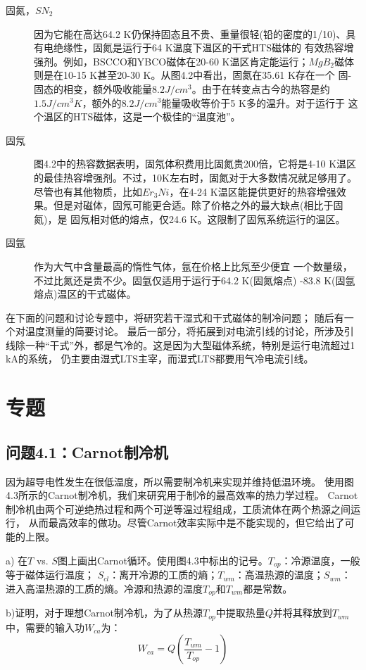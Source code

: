 \begin{description}
  \item[固氮，$SN_2$] 因为它能在高达64.2 K仍保持固态且不贵、重量很轻(铅的密度的1/10)、具有电绝缘性，固氮是运行于64 K温度下温区的干式HTS磁体的
  有效热容增强剂。例如，BSCCO和YBCO磁体在20-60 K温区肯定能运行；$MgB_2$磁体则是在10-15 K甚至20-30 K。从图4.2中看出，固氮在35.61 K存在一个
  固-固态的相变，额外吸收能量$8.2J/cm^3$。由于在转变点古今的热容是约$1.5J/cm^3 K$，额外的$8.2J/cm^3$能量吸收等价于5 K多的温升。对于运行于
  这个温区的HTS磁体，这是一个极佳的“温度池”。
  \item[固氖] 图4.2中的热容数据表明，固氖体积费用比固氮贵200倍，它将是4-10 K温区的最佳热容增强剂。不过，10K左右时，固氮对于大多数情况就足够用了。
  尽管也有其他物质，比如$Er_3 Ni$，在4-24 K温区能提供更好的热容增强效果。但是对磁体，固氖可能更合适。除了价格之外的最大缺点(相比于固氮)，是
  固氖相对低的熔点，仅24.6 K。这限制了固氖系统运行的温区。
  \item[固氩] 作为大气中含量最高的惰性气体，氩在价格上比氖至少便宜 一个数量级，不过比氮还是贵不少。固氩仅适用于运行于64.2 K(固氮熔点)
  -83.8 K(固氩熔点)温区的干式磁体。
\end{description}

在下面的问题和讨论专题中，将研究若干湿式和干式磁体的制冷问题；
随后有一个对温度测量的简要讨论。
最后一部分，将拓展到对电流引线的讨论，所涉及引线除一种“干式”外，都是气冷的。这是因为大型磁体系统，特别是运行电流超过1 kA的系统，
仍主要由湿式LTS主宰，而湿式LTS都要用气冷电流引线。

\section{专题}
\subsection{问题4.1：Carnot制冷机}
因为超导电性发生在很低温度，所以需要制冷机来实现并维持低温环境。
使用图4.3所示的Carnot制冷机，我们来研究用于制冷的最高效率的热力学过程。
Carnot制冷机由两个可逆绝热过程和两个可逆等温过程组成，工质流体在两个热源之间运行，
从而最高效率的做功。尽管Carnot效率实际中是不能实现的，但它给出了可能的上限。

a) 在$T$ vs. $S$图上画出Carnot循环。使用图4.3中标出的记号。$T_{op}$：冷源温度，一般等于磁体运行温度；
$S_{cl}$：离开冷源的工质的熵；$T_{wm}$：高温热源的温度；$S_{wm}$：进入高温热源的工质的熵。冷源和热源的温度$T_{op}$和$T_{wm}$都是常数。

b)证明，对于理想Carnot制冷机，为了从热源$T_{op}$中提取热量$Q$并将其释放到$T_{wm}$中，需要的输入功$W_{ca}$为：
\begin{equation}%
W_{ca}=Q(\frac{T_{wm}}{T_{op}}-1)
\end{equation}

